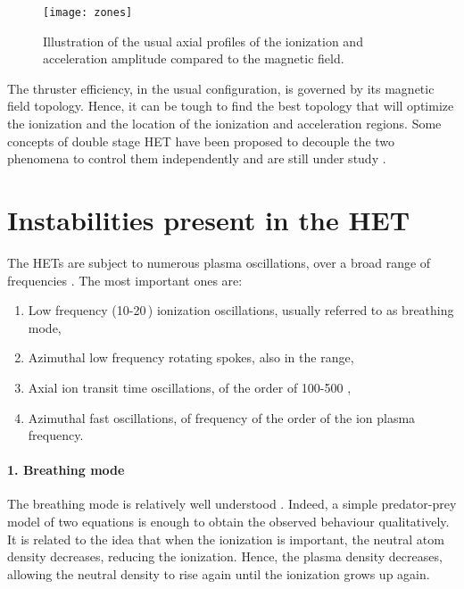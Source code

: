   \begin{figure}[hbtp]
    \centering
    \texttt{[image: zones]}
    \caption{Illustration of the usual axial profiles of the ionization and acceleration amplitude compared to the magnetic field.}
    \label{fig-zones}
  \end{figure}

  The thruster efficiency, in the usual configuration, is governed by its magnetic field topology.
  Hence, it can be tough to find the best topology that will optimize the ionization and the location of the ionization and acceleration regions.
  Some concepts of double stage \ac{HET} have been proposed to decouple the two phenomena to control them independently and are still under study \citep{dubois2018}.
  

  
  \section*{Instabilities present in the \ac{HET} }
  \label{sec-physics}

  The \ac{HET}s are subject to numerous plasma oscillations, over a broad range of frequencies \citep{boeuf2017,choueiri2001}.
  The most important ones are\string:
  \begin{enumerate}
    \item Low frequency (10-20\,\kilo\hertz) ionization oscillations, usually referred to as breathing mode,
    \item Azimuthal low frequency rotating spokes, also in the \kilo\hertz{} range,
    \item Axial ion transit time oscillations, of the order of 100-500 \kilo\hertz,
    \item Azimuthal fast oscillations, of frequency of the order of the ion plasma frequency.
  \end{enumerate} 

  \paragraph{1. Breathing mode\\}
  The breathing mode is relatively well understood \citep{boeuf1998,barral2009,hara2014}.
  Indeed, a simple predator-prey model of two equations is enough to obtain the observed behaviour qualitatively.
  It is related to the idea that when the ionization is important, the neutral atom density decreases, reducing the ionization.
  Hence, the plasma density decreases, allowing the neutral density to rise again until the ionization grows up again.

